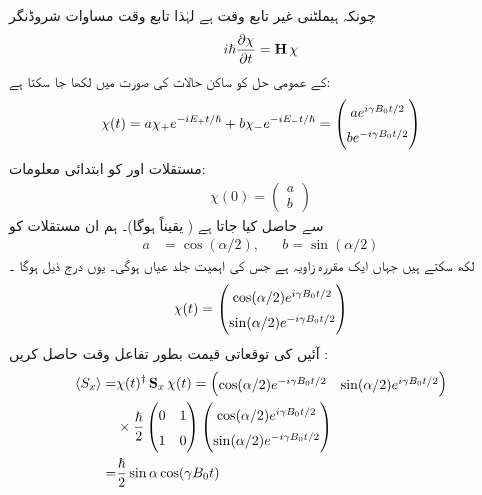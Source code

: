  چونکہ ہیملٹنی غیر تابع وقت ہے لہٰذا تابع وقت مساوات شروڈنگر 
\begin{align}\label{مساوات_تین_ابعادی_شروڈنگر_شائے_روپ}
i \hslash \frac{\partial \chi}{\partial t} = \operatorname{\mathbf{H}} \chi
\end{align}
کے عمومی حل کو ساکن حالات کی صورت میں لکھا جا سکتا ہے:
\begin{align*}
\chi (t) = a \chi_+ e^{- i E_{+} t/\hslash} + b \chi_{-} e^{- i E_{-} t / \hslash} = 
\begin{pmatrix}
\renewcommand{\arraystretch}{1.5}
a e^{i \gamma B_0 t /2} \\
b e^{- i \gamma B_0 t/2}
\end{pmatrix}
\end{align*}
مستقلات  اور  کو ابتدائی معلومات: 
\begin{align*}
\chi (0) = 
\begin{pmatrix}
a \\
b
\end{pmatrix}
\end{align*}
سے حاصل کیا جاتا ہے ( یقیناً   ہوگا)۔   ہم ان مستقلات کو
\begin{align*}
a& = \cos (\alpha/2), && b = \sin (\alpha/2)
\end{align*}
 لکھ سکتے ہیں جہاں  ایک مقررہ زاویہ ہے  جس کی اہمیت جلد  عیاں  ہوگی۔ یوں درج ذیل ہوگا ۔
\begin{align}
\renewcommand{\arraystretch}{1.5}
\chi(t) = 
\begin{pmatrix}
\cos (\alpha/2) e^{i \gamma B_0 t/2} \\
\sin (\alpha/2) e^{- i \gamma B_0 t /2}
\end{pmatrix}
\end{align}
آئیں  کی توقعاتی قیمت بطور تفاعل وقت حاصل کریں :
\begin{align}
\langle S_x \rangle =& \chi (t)^{\dagger} \mat{S}_x \chi (t) = 
\begin{pmatrix}
\cos(\alpha/2) e^{- i \gamma B_0 t/2} & \sin(\alpha/2) e^{i \gamma B_0 t/2} 
\end{pmatrix} \nonumber\\
& \times \frac{\hslash}{2}
\begin{pmatrix}
0 & 1 \\
1 & 0
\end{pmatrix}
\begin{pmatrix}
\cos(\alpha /2) e^{i \gamma B_0 t/2} \\
\sin(\alpha/2) e^{- i \gamma B_0 t/2}
\end{pmatrix} \nonumber \\
=& \frac{\hslash}{2} \sin \alpha \cos (\gamma B_0 t) 
\end{align}
